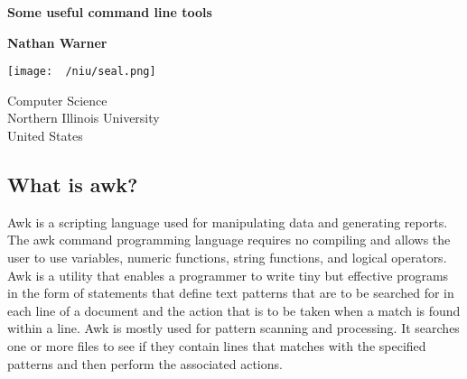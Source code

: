 \documentclass{report}
\title{\Huge{}}
\author{\huge{Nathan Warner}}
\date{\huge{}}
\begin{document}
        \begin{titlepage}
       \begin{center}
           \vspace*{1cm}
    
           \textbf{Some useful command line tools}
    
           \vspace{0.5cm}
            
                
           \vspace{1.5cm}
    
           \textbf{Nathan Warner}
    
           \vfill
                
                
           \vspace{0.8cm}
         
           \texttt{[image: ~/niu/seal.png]}
                
           Computer Science \\
           Northern Illinois University\\
           United States\\
           
                
       \end{center}
    \end{titlepage}
    \tableofcontents
 \pagebreak 
    \bigbreak \noindent 
    \subsection{What is awk?}
    \bigbreak \noindent 
    Awk is a scripting language used for manipulating data and generating reports. The awk command programming language requires no compiling and allows the user to use variables, numeric functions, string functions, and logical operators. 
    \bigbreak \noindent 
    Awk is a utility that enables a programmer to write tiny but effective programs in the form of statements that define text patterns that are to be searched for in each line of a document and the action that is to be taken when a match is found within a line. Awk is mostly used for pattern scanning and processing. It searches one or more files to see if they contain lines that matches with the specified patterns and then perform the associated actions.
    \bigbreak \noindent 
\end{document}
